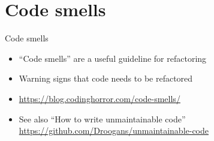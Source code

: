 \part{Code smells}
\frame{\partpage}

\begin{frame}{Code smells}
    \begin{itemize}
        \pause\item ``Code smells'' are a useful guideline for refactoring
        \pause\item Warning signs that code needs to be refactored
        \pause\item \url{https://blog.codinghorror.com/code-smells/}
        \pause\item See also ``How to write unmaintainable code'' \url{https://github.com/Droogans/unmaintainable-code}
    \end{itemize}
\end{frame}

